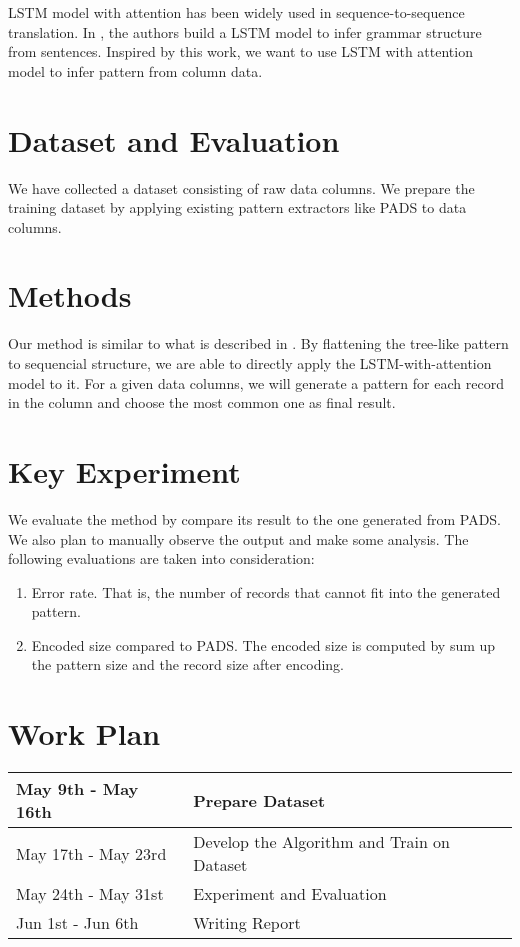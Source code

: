 \documentclass{article}
\begin{document}
LSTM model with attention has been widely used in sequence-to-sequence
translation. In \cite{grammar_2014}, the authors build a LSTM model to infer grammar
structure from sentences. Inspired by this work, we want to use LSTM with
attention model to infer pattern from column data.

\section{Dataset and Evaluation}
We have collected a dataset consisting of raw data columns. We prepare
the training dataset by applying existing pattern extractors like
PADS\cite{pads_2008} to data columns.

\section{Methods}

Our method is similar to what is described in \cite{grammar_2014}. By flattening
the tree-like pattern to sequencial structure, we are able to directly apply the
LSTM-with-attention model to it. For a given data columns, we will generate a
pattern for each record in the column and choose the most common one as final result.

\section{Key Experiment}
We evaluate the method by compare its result to the one generated from PADS.
We also plan to manually observe the output and make some analysis. The
following evaluations are taken into consideration:
\begin{enumerate}
  \item Error rate. That is, the number of records that cannot fit into the
  generated pattern.
  \item Encoded size compared to PADS. The encoded size is computed by sum up
  the pattern size and the record size after encoding.
\end{enumerate}

\section{Work Plan}
\begin{tabular}{l|l}
May 9th - May 16th & Prepare Dataset\\
\hline
May 17th - May 23rd & Develop the Algorithm and Train on Dataset\\
\hline
May 24th - May 31st & Experiment and Evaluation \\
\hline
Jun 1st - Jun 6th & Writing Report
\end{tabular}



\end{document}
